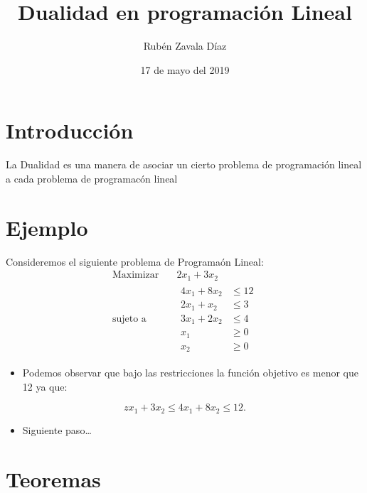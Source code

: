 \documentclass[11pt]{article}
\author{Rubén Zavala Díaz}
\date{17 de mayo del 2019}
\title{Dualidad en programación Lineal}
\begin{document}
\maketitle
\tableofcontents


\section{Introducción}
\label{sec:org389be92}
La Dualidad es una manera de asociar un cierto problema de
programación lineal a cada problema de programacón lineal
\section{Ejemplo}
\label{sec:org7bca6a7}

Consideremos el siguiente problema de Programaón Lineal:
\begin{equation*}
 \begin{aligned}
 \text{Maximizar} \quad & 2x_{1}+3x_{2}\\
 \text{sujeto a} \quad &
   \begin{aligned}
    4x_{1}+8x_{2} &\leq 12\\
    2x_{1}+x_{2} &\leq 3\\
    3x_{1}+2x_{2} &\leq 4\\
    x_{1} &\geq  0\\
    x_{2} &\geq 0
   \end{aligned}
 \end{aligned}
 \end{equation*}

\begin{itemize}
\item Podemos observar que bajo las restricciones la función objetivo es menor que 12 ya que:
\end{itemize}
\begin{equation*}
     zx_{1}+3x_{2}\leq 4x_{1}+8x_{2}\leq 12.
\end{equation*}
\begin{itemize}
\item Siguiente paso\ldots{}
\end{itemize}
\section{Teoremas}
\label{sec:org010a598}
\end{document}
